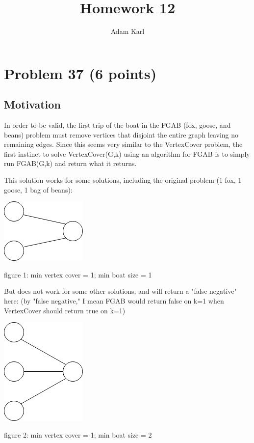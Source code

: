 \documentclass[a4paper]{article}
\title{Homework 12}
\author{Adam Karl}
\begin{document}
\maketitle

\section{Problem 37 (6 points)}
\subsection{Motivation}
In order to be valid, the first trip of the boat in the FGAB (fox, goose, and beans) problem must remove vertices that disjoint the entire graph leaving no remaining edges. Since this seems very similar to the VertexCover problem, the first instinct to solve VertexCover(G,k) using an algorithm for FGAB is to simply run FGAB(G,k) and return what it returns. 

This solution works for some solutions, including the original problem (1 fox, 1 goose, 1 bag of beans):

\begin{center}
    \includegraphics[scale=.5]{1vc1fgab.png}
    
    \caption{figure 1: min vertex cover = 1; min boat size = 1}
\end{center}

But does not work for some other solutions, and will return a "false negative" here:
(by "false negative," I mean FGAB would return false on k=1 when VertexCover should return true on k=1)

\begin{center}
    \includegraphics[scale=.5]{1vc2fgab.png}
    
    \caption{figure 2: min vertex cover = 1; min boat size = 2}
\end{center}
\end{document}
